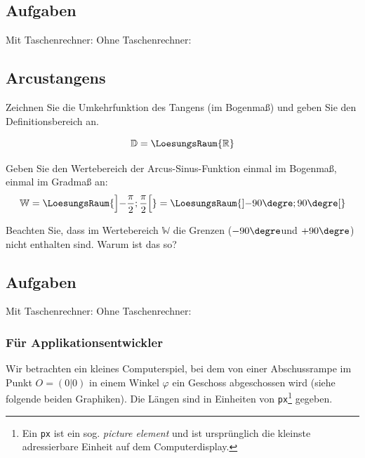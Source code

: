 \subsection*{Aufgaben}
Mit Taschenrechner:
Ohne Taschenrechner:


\newpage


\subsection{Arcustangens}
Zeichnen Sie die Umkehrfunktion des Tangens (im Bogenmaß) und geben Sie den Definitionsbereich an.



$$\mathbb{D} = \LoesungsRaum{\mathbb{R}}$$

Geben Sie den Wertebereich der Arcus-Sinus-Funktion einmal im Bogenmaß,
einmal im Gradmaß an:
$$\mathbb{W} = \LoesungsRaum{\left]-\frac{\pi}{2}; \frac{\pi}{2}\right[}  = \LoesungsRaum{\left]-90\degre; 90\degre\right[}$$

Beachten Sie, dass im Wertebereich $\mathbb{W}$ die Grenzen ($-90\degre$und $+90\degre$) nicht enthalten sind. Warum ist das so?

\subsection*{Aufgaben}
Mit Taschenrechner:
Ohne Taschenrechner:
\newpage


\subsubsection{Für Applikationsentwickler}

Wir betrachten ein kleines Computerspiel, bei dem von einer
Abschussrampe im Punkt $O=(0|0)$ in einem Winkel $\varphi$ ein Geschoss
abgeschossen wird (siehe folgende beiden Graphiken). Die Längen sind
in Einheiten von \texttt{px}\footnote{Ein \texttt{px} ist ein
  sog. \textit{picture element} und ist ursprünglich die kleinste adressierbare
  Einheit auf dem Computerdisplay.} gegeben.

